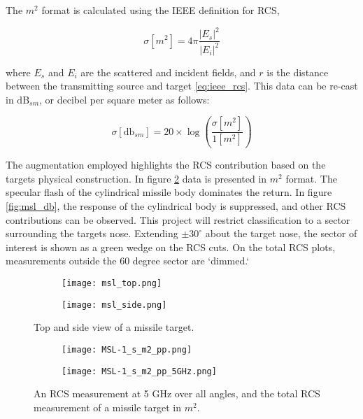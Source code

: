 	The $m^2$ format is calculated using the IEEE definition for RCS,

	\begin{equation}\label{eq:ieee_rcs}
			\sigma [m^2] = 4\pi \frac{|E_{s}|^2}{|E_{i}|^2}
	\end{equation}

	where $E_s$ and $E_i$ are the scattered and incident fields, and $r$ is the distance between the transmitting source and target \ref{eq:ieee_rcs}\cite{Knott}. This data can be re-cast in $\textrm{dB}_{sm}$, or decibel per square meter as follows:

	\begin{equation}\label{eq:ieee_dbsm}
			\sigma [\textrm{db}_{sm}] = 20\times \log\left( \frac{\sigma [m^2]}{1 [m^2]}\right)
	\end{equation}

	The augmentation employed highlights the RCS contribution based on the targets physical construction. In figure \ref{fig:msl_m2} data is presented in $m^2$ format. The specular flash of the cylindrical missile body dominates the return. In figure \ref{fig:msl_db}, the response of the cylindrical body is suppressed, and other RCS contributions can be observed. This project will restrict classification to a sector surrounding the targets nose. Extending $\pm 30^{\circ}$ about the target nose, the sector of interest is shown as a green wedge on the RCS cuts. On the total RCS plots, measurements outside the 60 degree sector are `dimmed.`

	\begin{figure}[htbp]
	  \centering
	  \begin{subfigure}{.5\textwidth}
	    \centering
	    \texttt{[image: msl\_top.png]}
	  \end{subfigure}%
	  \begin{subfigure}{.5\textwidth}
	    \centering
	    \texttt{[image: msl\_side.png]}
	  \end{subfigure}
	  \caption[Target missile]{Top and side view of a missile target.}
	  \label{fig:msl_target}
	\end{figure}

	\begin{figure}[htbp]
	  \centering
	  \begin{subfigure}{.5\textwidth}
	    \centering
	    \texttt{[image: MSL-1\_s\_m2\_pp.png]}
	  \end{subfigure}%
	  \begin{subfigure}{.5\textwidth}
	    \centering
	    \texttt{[image: MSL-1\_s\_m2\_pp\_5GHz.png]}
	  \end{subfigure}
	  \caption[Missile RCS data sample (Cut)]{An RCS measurement at 5 GHz over all angles, and the total RCS measurement of a missile target in $m^2$.}
	  \label{fig:msl_m2}
	\end{figure}

